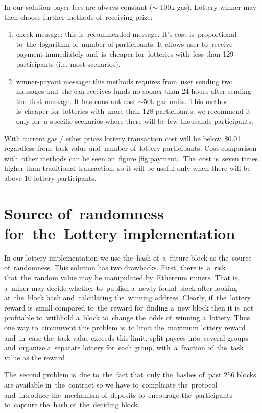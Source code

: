 \documentclass[a4paper]{article}
\begin{document}
    In our solution payer fees are always constant ($\sim$ 100k gas).
    Lottery winner may then choose further methods of~receiving prize:
    \begin{enumerate}
        \item check message: this is~recommended message. It's cost is~proportional to~the~logarithm of~number of
            participants. It allows user to~receive payment immediately and~is~cheaper for~lotteries with~less than 129
            participants (i.e. most scenarios).
        \item winner-payout message: this methods requires from~user sending two messages and~she can receives funds no
            sooner than 24 hours after sending the~first message. It has constant cost $\sim$50k gas units.
            This method is~cheaper for~lotteries with~more than 128 participants, we recommend it only for~a specific
            scenarios where there will be few thousands participants.
    \end{enumerate}

    With current gas / ether prices lottery transaction cost will be below~\$0.01 regardless from~task value and~number
    of~lottery participants. Cost comparison with~other methods can be seen on~figure \ref{fig:payment}.
    The~cost is~seven times higher than traditional transaction, so it will be useful only  when there will be above
    10 lottery participants.

\section{Source of~randomness for~the~Lottery implementation}
\label{sec:randomness}
    In our lottery implementation we use the~hash of~a~future block as the~source of~randomness. This solution has
    two drawbacks. First, there is~a~risk that~the~random value may be manipulated by~Ethereum miners. That is,
    a~miner may decide whether to~publish a~newly found block after looking at~the~block hash and~calculating
    the~winning address. Clearly, if~the~lottery reward is~small compared to~the~reward for~finding a~new block
    then it is~not profitable to~withhold a~block to~change the~odds of~winning a~lottery. Thus one way to~circumvent
    this problem is~to limit the~maximum lottery reward and~in~case the~task value exceeds this limit, split payees
    into~several groups and~organize a~separate lottery for~each group, with~a~fraction of~the~task value as the
    reward.

    The~second problem is~due to~the~fact that~only the~hashes of~past 256 blocks are available in~the~contract
    so we have to~complicate the~protocol and~introduce the~mechanism of~deposits to~encourage the~participants
    to~capture the~hash of~the~deciding block.
\end{document}
